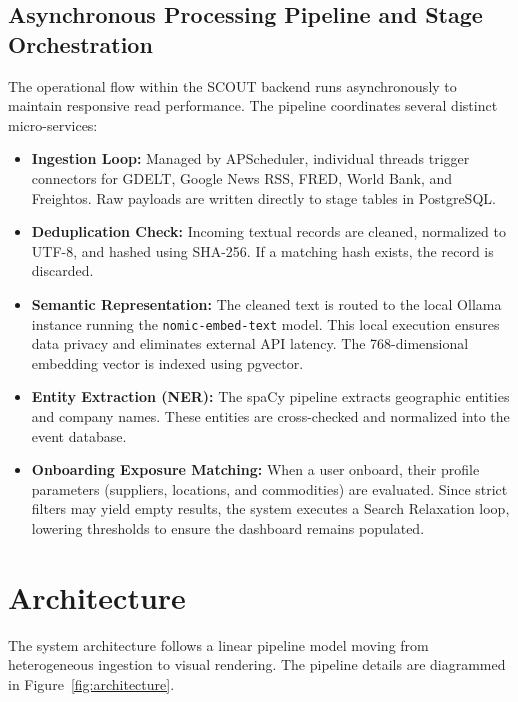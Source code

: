 \documentclass[12pt]{report}
\begin{document}
\newpage
\subsection{Asynchronous Processing Pipeline and Stage Orchestration}
The operational flow within the SCOUT backend runs asynchronously to maintain responsive read performance.
The pipeline coordinates several distinct micro-services:
\begin{itemize}
    \item \textbf{Ingestion Loop:} Managed by APScheduler, individual threads trigger connectors for GDELT, Google News RSS, FRED, World Bank, and Freightos. Raw payloads are written directly to stage tables in PostgreSQL.
    \item \textbf{Deduplication Check:} Incoming textual records are cleaned, normalized to UTF-8, and hashed using SHA-256. If a matching hash exists, the record is discarded.
    \item \textbf{Semantic Representation:} The cleaned text is routed to the local Ollama instance running the \texttt{nomic-embed-text} model. This local execution ensures data privacy and eliminates external API latency. The 768-dimensional embedding vector is indexed using pgvector.
    \item \textbf{Entity Extraction (NER):} The spaCy pipeline extracts geographic entities and company names. These entities are cross-checked and normalized into the event database.
    \item \textbf{Onboarding Exposure Matching:} When a user onboard, their profile parameters (suppliers, locations, and commodities) are evaluated. Since strict filters may yield empty results, the system executes a Search Relaxation loop, lowering thresholds to ensure the dashboard remains populated.
\end{itemize}

\newpage
\section{Architecture}
The system architecture follows a linear pipeline model moving from heterogeneous ingestion to visual rendering. The pipeline details are diagrammed in Figure~\ref{fig:architecture}.
\end{document}
